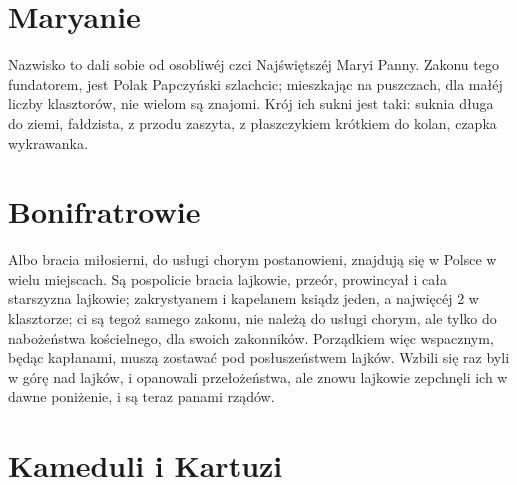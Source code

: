 \documentclass{book}
\begin{document}
\section{Maryanie}

Nazwisko to dali sobie od osobliwéj czci Najświętszéj Maryi Panny. Zakonu tego fundatorem, jest Polak Papczyński szlachcic; mieszkając na puszczach, dla małéj liczby klasztorów, nie wielom są znajomi. Krój ich sukni jest taki: suknia długa do ziemi, fałdzista, z przodu zaszyta, z płaszczykiem krótkiem do kolan, czapka wykrawanka.

\section{Bonifratrowie}

Albo bracia miłosierni, do usługi chorym postanowieni, znajdują się w Polsce w wielu miejscach. Są pospolicie bracia lajkowie, przeór, prowincyał i cała starszyzna lajkowie; zakrystyanem i kapelanem ksiądz jeden, a najwięcéj 2 w klasztorze; ci są tegoż samego zakonu, nie należą do usługi chorym, ale tylko do nabożeństwa kościelnego, dla swoich zakonników. Porządkiem więc wspacznym, będąc kapłanami, muszą zostawać pod posłuszeństwem lajków. Wzbili się raz byli w górę nad lajków, i opanowali przełożeństwa, ale znowu lajkowie zepchnęli ich w dawne poniżenie, i są teraz panami rządów.

\section{Kameduli i Kartuzi}
\end{document}
